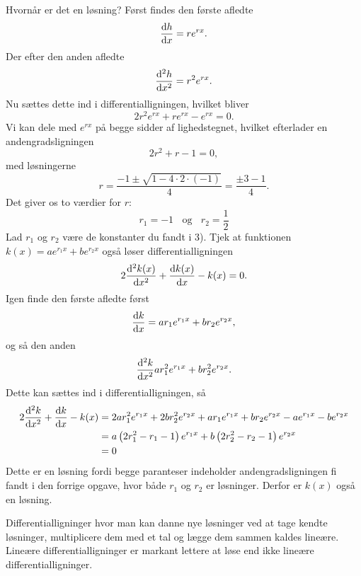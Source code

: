 \begin{opgave}[2]{Hvornår er det en løsning?}
	Først findes den første afledte
$$
\dv{h}{x}=re^{rx}.
$$
Der efter den anden afledte
$$
\dv[2]{h}{x}=r^2e^{rx}.
$$
Nu sættes dette ind i differentialligningen, hvilket bliver
$$
2r^2e^{rx}+re^{rx}-e^{rx}=0.
$$
Vi kan dele med $e^{rx}$ på begge sidder af lighedstegnet, hvilket efterlader en andengradsligningen
$$
2r^2+r-1=0,
$$
med løsningerne
$$
r=\frac{-1\pm\sqrt{1-4\cdot 2\cdot (-1)}}{4}=\frac{\pm 3-1}{4}.
$$
Det giver os to værdier for $r$:
$$r_1=-1~~~~\text{og}~~~~r_2=\frac{1}{2}$$
	\opg Lad $r_1$ og $r_2$ være de konstanter du fandt i 3). Tjek at funktionen $k (x) = ae^{r_1x} + be^{r_2x} $ også løser differentialligningen
	\begin{align*}
	2 \dv[2]{k(x)}{x} + \dv{k(x)}{x} - k(x) = 0.
	\end{align*}
Igen finde den første afledte først
$$
\dv{k}{x}=ar_1e^{r_1x}+br_2e^{r_2x},
$$
og så den anden
$$
\dv[2]{k}{x}ar_1^2e^{r_1x}+br_2^2e^{r_2x}.
$$
Dette kan sættes ind i differentialligningen, så
\begin{align*}
2\dv[2]{k}{x}+\dv{k}{x}-k(x)&=2ar_1^2e^{r_1x}+2br_2^2e^{r_2x}+ar_1e^{r_1x}+br_2e^{r_2x}-ae^{r_1x}-be^{r_2x}\\
&=a\left(2r_1^2-r_1-1\right)e^{r_1x}+b\left(2r_2^2-r_2-1\right)e^{r_2x}\\
&=0
\end{align*}
Dette er en løsning fordi begge paranteser indeholder andengradsligningen fi fandt i den forrige opgave, hvor både $r_1$ og $r_2$ er løsninger. Derfor er $k(x)$ også en løsning.

Differentialligninger hvor man kan danne nye løsninger ved at tage kendte løsninger, multiplicere dem med et tal og lægge dem sammen kaldes lineære. Lineære differentialligninger er markant lettere at løse end ikke lineære differentialligninger.
\end{opgave}

